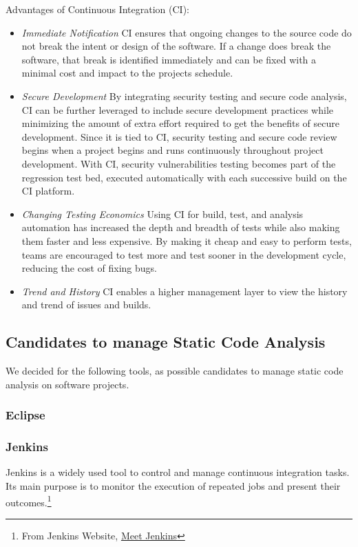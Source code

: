 \documentclass[conference]{IEEEtran}
\begin{document}
Advantages of Continuous Integration (CI)\cite{SecurityinCI}:
\begin{itemize}
	\item \textit{Immediate Notification}
	CI ensures that ongoing changes to the source code do not break the intent or design of the software. If a change does break the software, that break is identified immediately and can be fixed with a minimal cost and impact to the projects schedule.
	
	\item \textit{Secure Development}
	By integrating security testing and secure code analysis, CI can be further leveraged to include secure development practices while minimizing the amount of extra effort required to get the benefits of secure development. Since it is tied to CI,
	security testing and secure code review begins when a project begins and runs continuously
	throughout project development. With CI, security vulnerabilities testing becomes part of the regression test bed, executed automatically with each successive build on the CI platform.

	\item \textit{Changing Testing Economics}
	Using CI for build, test, and analysis automation has increased the depth and breadth of tests while also making them faster and less expensive. By making it cheap and easy to perform tests, teams are encouraged to test more and test sooner in the development cycle, reducing the cost of fixing bugs.
	
	\item \textit{Trend and History}
	CI enables a higher management layer to view the history and trend of issues and builds.
	
\end{itemize}


\subsection{Candidates to manage Static Code Analysis}
\label{subsec:candidates-to-manage-static-code-analysis}
We decided for the following tools, as possible candidates to manage static code analysis on software projects.


\subsubsection{Eclipse}
\label{subsubsec:eclipse}


\subsubsection{Jenkins}
\label{subsubsec:jenkins}
Jenkins is a widely used tool to control and manage continuous integration tasks. Its main purpose is to monitor the execution of repeated jobs and present their outcomes.\footnote{From Jenkins Website, \href{https://wiki.jenkins-ci.org/display/JENKINS/Meet+Jenkins}{Meet Jenkins}}
\end{document}
